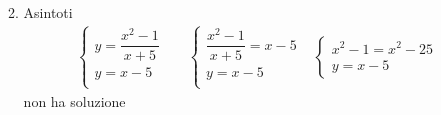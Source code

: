 \begin{exercise}
\begin{itemize}
\begin{enumerate}
\begin{align*}
		\end{align*}
		\item Asintoti
		\begin{align*}
		&\begin{cases}
	y=\dfrac{x^2-1}{x+5}\\
	y=x-5\\
	\end{cases}&&\begin{cases}
	\dfrac{x^2-1}{x+5}=x-5\\
	y=x-5\\
	\end{cases}
	&\begin{cases}
	x^2-1=x^2-25\\
	y=x-5
	\end{cases}
		\end{align*}
		non ha soluzione 
	\end{enumerate}
	\end{itemize}
	\begin{center}
		
	\end{center}
\end{exercise}
